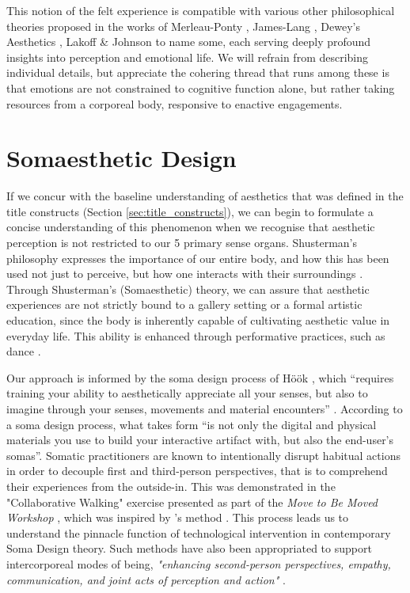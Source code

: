 This notion of the felt experience is compatible with various other philosophical theories proposed in the works of Merleau-Ponty \cite{merleau-ponty_phenomenology_2012}, James-Lang \cite{cannon_james-lange_1927}, Dewey's Aesthetics \cite{dewey_aesthetic_1950}, Lakoff \& Johnson \cite{lakoff_philosophy_1999} to name some, each serving deeply profound insights into perception and emotional life. We will refrain from describing individual details, but appreciate the cohering thread that runs among these is that emotions are not constrained to cognitive function alone, but rather taking resources from a corporeal body, responsive to enactive engagements.

\section{Somaesthetic Design}

If we concur with the baseline understanding of aesthetics that was defined in the title constructs (Section \ref{sec:title_constructs}), we can begin to formulate a concise understanding of this phenomenon when we recognise that aesthetic perception is not restricted to our 5 primary sense organs. Shusterman's philosophy expresses the importance of our entire body, and how this has been used not just to perceive, but how one interacts with their surroundings \cite{shusterman_body_2008}. Through Shusterman’s (Somaesthetic) theory, we can assure that aesthetic experiences are not strictly bound to a gallery setting or a formal artistic education, since the body is inherently capable of cultivating aesthetic value in everyday life. This ability is enhanced through performative practices, such as dance \cite{eric_c_mullis_performative_2006,shusterman_body_2012}.

Our approach is informed by the soma design process of Höök \cite{hook_designing_2018}, which “requires training your ability to aesthetically appreciate all your senses, but also to imagine through your senses, movements and material encounters” \cite{hook_soma_2019}. According to a soma design process, what takes form “is not only the digital and physical materials you use to build your interactive artifact with, but also the end-user's somas”. Somatic practitioners are known to intentionally disrupt habitual actions in order to decouple first and third-person perspectives, that is to comprehend their experiences from the outside-in. This was demonstrated in the "Collaborative Walking" exercise presented as part of the \textit{Move to Be Moved Workshop} \cite{hook_embracing_2018}, which was inspired by \citeauthor{loke_moving_2013}'s method \cite{loke_moving_2013}. This process leads us to understand the pinnacle function of technological intervention in contemporary Soma Design theory. Such methods have also been appropriated to support intercorporeal modes of being, \textit{"enhancing second-person perspectives, empathy, communication, and joint acts of perception and action"} \cite{turmo_vidal_designing_2021}.

